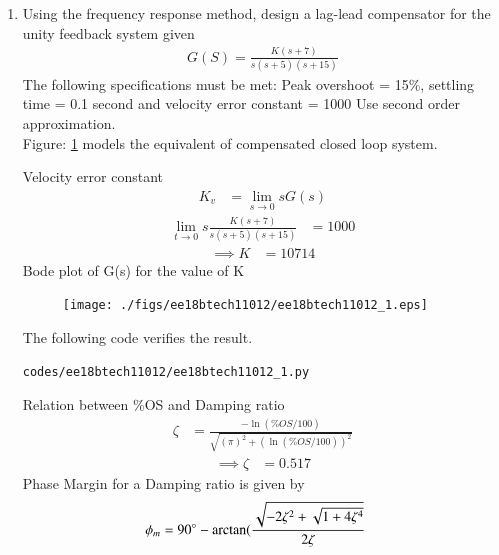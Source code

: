 \begin{enumerate}[label=\thesubsection.\arabic*.,ref=\thesubsection.\theenumi]
\item Using the frequency response method, design a lag-lead compensator for the unity feedback system given 
\begin{align}
G(S) = \frac{K(s+7)}{s(s+5)(s+15)}
\end{align}
The following specifications must be met: Peak overshoot = 15\%, settling time = 0.1 second and velocity error constant = 1000
Use second order approximation. \\
%
\solution Figure: \ref{fig:1;} models the equivalent of compensated closed loop system. 
\begin{figure}[!ht]
\begin{center}
		\resizebox{\columnwidth}{!}{}
\end{center}
\caption{}
\label{fig:1;}
\end{figure}
%
Velocity error constant  
\begin{align}
K_{v} &=  \lim_{s \to 0}sG(s)
\end{align}
\begin{align}
\lim_{t \to 0}s\frac{K(s+7)}{s(s+5)(s+15)} &= 1000
\end{align}
\begin{align}
\implies K &= 10714
\end{align}
Bode plot of G(s) for the value of K
\begin{figure}[!ht]
\centering
  \texttt{[image: ./figs/ee18btech11012/ee18btech11012\_1.eps]}
\caption{}
\label{fig:ee18btech11012}
\end{figure}
The following code verifies the result.
\begin{lstlisting}
codes/ee18btech11012/ee18btech11012_1.py
\end{lstlisting}
Relation between \%OS and Damping ratio
\begin{align}
\zeta &= \frac{-\ln(\%OS/100)}{\sqrt{(\pi)^2 + (\ln(\%OS/100))^2}}
\end{align}
\begin{align}
\implies\zeta &= 0.517 
\end{align}
Phase Margin for a Damping ratio is given by
\begin{align}
\phi_{m} &= 90\degree - \arctan(\frac{\sqrt{-2\zeta^2+\sqrt{1+4\zeta^4}}}{2\zeta}
\end{align}
\begin{align}

\end{align}
\end{enumerate}
